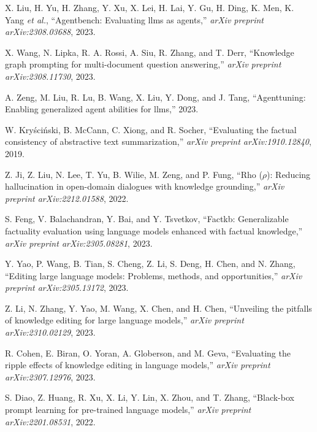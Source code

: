 \begin{enumerate}[leftmargin=2em,label={[\arabic*]}]
\item X. Liu, H. Yu, H. Zhang, Y. Xu, X. Lei, H. Lai, Y. Gu, H. Ding, K. Men, K. Yang \textit{et al.}, ``Agentbench: Evaluating llms as agents,'' \textit{arXiv preprint arXiv:2308.03688}, 2023.

\item X. Wang, N. Lipka, R. A. Rossi, A. Siu, R. Zhang, and T. Derr, ``Knowledge graph prompting for multi-document question answering,'' \textit{arXiv preprint arXiv:2308.11730}, 2023.

\item A. Zeng, M. Liu, R. Lu, B. Wang, X. Liu, Y. Dong, and J. Tang, ``Agenttuning: Enabling generalized agent abilities for llms,'' 2023.

\item W. Kry\'{s}ci\'{n}ski, B. McCann, C. Xiong, and R. Socher, ``Evaluating the factual consistency of abstractive text summarization,'' \textit{arXiv preprint arXiv:1910.12840}, 2019.

\item Z. Ji, Z. Liu, N. Lee, T. Yu, B. Wilie, M. Zeng, and P. Fung, ``Rho ($\rho$): Reducing hallucination in open-domain dialogues with knowledge grounding,'' \textit{arXiv preprint arXiv:2212.01588}, 2022.

\item S. Feng, V. Balachandran, Y. Bai, and Y. Tsvetkov, ``Factkb: Generalizable factuality evaluation using language models enhanced with factual knowledge,'' \textit{arXiv preprint arXiv:2305.08281}, 2023.

\item Y. Yao, P. Wang, B. Tian, S. Cheng, Z. Li, S. Deng, H. Chen, and N. Zhang, ``Editing large language models: Problems, methods, and opportunities,'' \textit{arXiv preprint arXiv:2305.13172}, 2023.

\item Z. Li, N. Zhang, Y. Yao, M. Wang, X. Chen, and H. Chen, ``Unveiling the pitfalls of knowledge editing for large language models,'' \textit{arXiv preprint arXiv:2310.02129}, 2023.

\item R. Cohen, E. Biran, O. Yoran, A. Globerson, and M. Geva, ``Evaluating the ripple effects of knowledge editing in language models,'' \textit{arXiv preprint arXiv:2307.12976}, 2023.

\item S. Diao, Z. Huang, R. Xu, X. Li, Y. Lin, X. Zhou, and T. Zhang, ``Black-box prompt learning for pre-trained language models,'' \textit{arXiv preprint arXiv:2201.08531}, 2022.


\end{enumerate}
